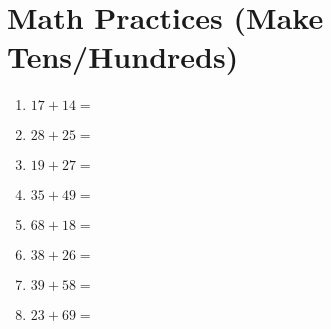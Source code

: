 \documentclass[a4paper,12pt]{article}
\begin{document}
\section*{\huge \center\textbf{Math Practices (Make Tens/Hundreds)}}
\vspace{1 cm}
\begin{multicols}{2}
\begin{enumerate}[label=\arabic*.]
    \item \textbf{\Large $17 + 14 =$} \underline{\hspace{2cm}} \vspace{4.5 cm}
    \item \textbf{\Large $28 + 25 =$} \underline{\hspace{2cm}} \vspace{4.5cm}
    \item \textbf{\Large $19 + 27 =$} \underline{\hspace{2cm}} \vspace{4.5cm}
    \item \textbf{\Large $35 + 49 =$} \underline{\hspace{2cm}} \vspace{4.5cm}
    \item \textbf{\Large $68 + 18 =$} \underline{\hspace{2cm}} \vspace{4.5cm}
    \item \textbf{\Large $38 + 26 =$} \underline{\hspace{2cm}} \vspace{4.5cm}
    \item \textbf{\Large $39 + 58 =$} \underline{\hspace{2cm}} \vspace{4.5cm}
    \item \textbf{\Large $23 + 69 =$} \underline{\hspace{2cm}} \vspace{4.5cm} %
\end{enumerate}
\end{multicols}
\end{document}
